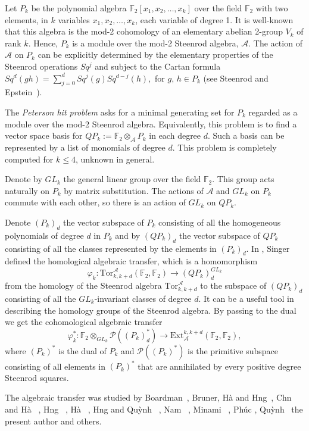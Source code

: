 \documentclass[reqno]{amsart}
\theoremstyle{plain}
\theoremstyle{definition}
\theoremstyle{plain}
\theoremstyle{definition}
\numberwithin{equation}{section}
\begin{document}
Let $P_k$ be the polynomial algebra $\mathbb F_2[x_1,x_2,\ldots ,x_k]$ over the field $\mathbb F_2$ with two elements, in $k$ variables $x_1, x_2, \ldots , x_k$, each variable of degree 1. It is well-known that this algebra is the mod-2 cohomology of an elementary abelian 2-group $V_k$ of rank $k$. Hence, $P_k$ is a module over the mod-2 Steenrod algebra, $\mathcal A$.
The action of $\mathcal A$ on $P_k$ can be explicitly determined by the elementary properties of the Steenrod operations $Sq^j$ and subject to the Cartan formula
$Sq^d(gh) = \sum_{j=0}^dSq^j(g)Sq^{d-j}(h),$
for $g,\, h \in P_k$ (see Steenrod and Epstein~\cite{st}).

The \textit{Peterson hit problem} asks for a minimal generating set for $P_k$ regarded as a module over the  mod-2 Steenrod algebra. Equivalently, this problem is to find a vector space basis for $QP_k := \mathbb F_2 \otimes_{\mathcal A} P_k$ in each degree $d$. Such a basis can be represented by a list of monomials of degree $d$.  This problem is completely computed for $k \leqslant 4$, unknown in general. 

Denote by $GL_k$ the general linear group over the field $\mathbb F_2$. This group acts naturally on $P_k$ by matrix substitution. The actions of $\mathcal A$ and $GL_k$ on $P_k$ commute with each other, so there is an action of $GL_k$ on $QP_k$. 

Denote $(P_k)_d$ the vector subspace of $P_k$ consisting of all the homogeneous polynomials of degree $d$ in $P_k$ and by $(QP_k)_d$ the vector subspace of $QP_k$ consisting of all the classes represented by the elements in $(P_k)_d$. 
In \cite{si1}, Singer defined the homological algebraic transfer, which is a homomorphism
$$\varphi_k :\mbox{Tor}^{\mathcal A}_{k,k+d} (\mathbb F_2,\mathbb F_2) \longrightarrow  (QP_k)_d^{GL_k}$$
from the homology of the Steenrod algebra $\mbox{Tor}^{\mathcal A}_{k,k+d}$ to the subspace of $(QP_k)_d$ consisting of all the $GL_k$-invariant classes of degree $d$. It can be a useful tool in describing the homology groups of the Steenrod algebra. By passing to the dual we get the cohomological algebraic transfer
$$\varphi_k^*: \mathbb F_2\otimes_{GL_k}\mathcal P((P_k)^*_d) \longrightarrow \mbox{Ext}_{\mathcal A}^{k, k+d}(\mathbb F_2, \mathbb F_2),$$
where $(P_k)^*$ is the dual of $P_k$ and $\mathcal P((P_k)^*)$ is the primitive subspace consisting of all elements in $(P_k)^*$ that are annihilated by every positive degree Steenrod squares.

The algebraic transfer was studied by  Boardman~\cite{bo}, Bruner, H\`a and H\uhorn ng~\cite{br}, Ch\ohorn n and H\`a~ \cite{cha,cha1,cha2},  H\uhorn ng ~\cite{hu}, H\`a ~\cite{ha}, H\uhorn ng and Qu\`ynh~ \cite{hq}, Nam~ \cite{na2}, Minami ~\cite{mi}, Ph\'uc \cite{p231,p24}, Qu\`ynh~ \cite{qh} the present author \cite{su4} and others.
\end{document}

